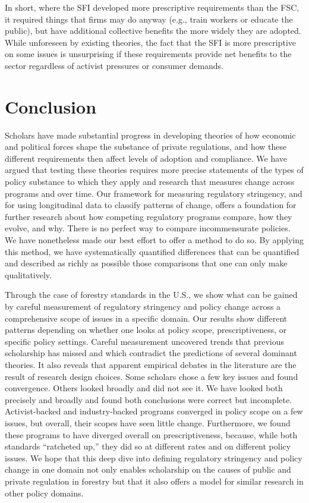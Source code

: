 \documentclass[
      12pt,
            Review ]{article}
\begin{document}
In short, where the SFI developed more prescriptive requirements than
the FSC, it required things that firms may do anyway (e.g., train
workers or educate the public), but have additional collective benefits
the more widely they are adopted. While unforeseen by existing theories,
the fact that the SFI is more prescriptive on some issues is
unsurprising if these requirements provide net benefits to the sector
regardless of activist pressures or consumer demands.

\section{Conclusion}\label{conclusion}

Scholars have made substantial progress in developing theories of how
economic and political forces shape the substance of private
regulations, and how these different requirements then affect levels of
adoption and compliance. We have argued that testing these theories
requires more precise statements of the types of policy substance to
which they apply and research that measures change across programs and
over time. Our framework for measuring regulatory stringency, and for
using longitudinal data to classify patterns of change, offers a
foundation for further research about how competing regulatory programs
compare, how they evolve, and why. There is no perfect way to compare
incommensurate policies. We have nonetheless made our best effort to
offer a method to do so. By applying this method, we have systematically
quantified differences that can be quantified and described as richly as
possible those comparisons that one can only make qualitatively.

Through the case of forestry standards in the U.S., we show what can be
gained by careful measurement of regulatory stringency and policy change
across a comprehensive scope of issues in a specific domain. Our results
show different patterns depending on whether one looks at policy scope,
prescriptiveness, or specific policy settings. Careful measurement
uncovered trends that previous scholarship has missed and which
contradict the predictions of several dominant theories. It also reveals
that apparent empirical debates in the literature are the result of
research design choices. Some scholars chose a few key issues and found
convergence. Others looked broadly and did not see it. We have looked
both precisely and broadly and found both conclusions were correct but
incomplete. Activist-backed and industry-backed programs converged in
policy scope on a few issues, but overall, their scopes have seen little
change. Furthermore, we found these programs to have diverged overall on
prescriptiveness, because, while both standards ``ratcheted up,'' they
did so at different rates and on different policy issues. We hope that
this deep dive into defining regulatory stringency and policy change in
one domain not only enables scholarship on the causes of public and
private regulation in forestry but that it also offers a model for
similar research in other policy domains.
\end{document}
